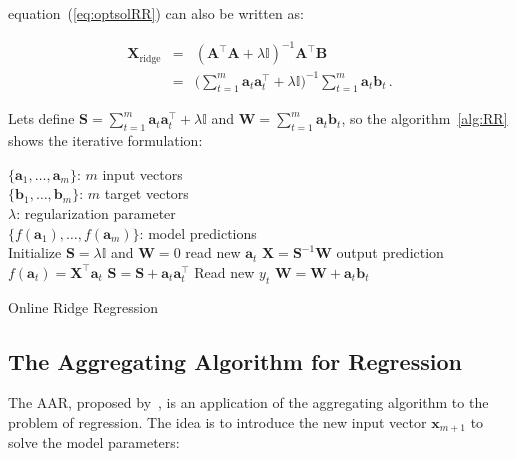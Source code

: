 \noindent equation~(\ref{eq:optsolRR}) can also be written as:

\begin{eqnarray*}
\label{eq:RReapand}
\mathbf{\mathbf{X}}_{\text{ridge}}&=&(\mathbf{A}^\top \mathbf{A}+ \lambda
\mathbb{I})^{-1}\mathbf{A}^\top \mathbf{B} \\
&=& \displaystyle \big (\sum_{t=1}^m
\mathbf{a}_t \mathbf{a}_t  ^\top + \lambda \mathbb{I}\big )^{-1}
\sum_{t=1}^m \mathbf{a}_t \mathbf{b}_t \, .
\end{eqnarray*}

Lets define $\displaystyle\mathbf{S}= \sum_{t=1}^m \mathbf{a}_t
\mathbf{a}_t  ^\top + \lambda \mathbb{I} $ and $\mathbf{W}=
\displaystyle\sum_{t=1}^m \mathbf{a}_t \mathbf{b}_t$, so the
algorithm~\ref{alg:RR} shows the iterative formulation:

\begin{algorithm}[H]
\begin{algorithmic}[1]
\REQUIRE $\,$ \\
$\{\mathbf{a}_1,\dots,\mathbf{a}_{m} \}$: $m$ input vectors \\
$\{\mathbf{b}_1,\dots,\mathbf{b}_{m} \}$: $m$ target vectors \\
$\lambda$: regularization parameter \\
\ENSURE  $\,$ \\
$\{f(\mathbf{a}_1),\dots,f(\mathbf{a}_{m}) \}$: model predictions \\
\STATE Initialize $\mathbf{S}=\lambda \mathbb{I}$
and $\mathbf{W}=0$
	\STATE read new $\mathbf{a}_t$
	\STATE $\mathbf{X}=\mathbf{S}^{-1}\mathbf{W}$
	\STATE output prediction $f(\mathbf{a}_t) = \mathbf{X}^\top \mathbf{a}_t$
   	\STATE $\mathbf{S} = \mathbf{S} + \mathbf{a}_t \mathbf{a}_t^\top$
   	\STATE Read new $y_t$
    	\STATE $\mathbf{W} = \mathbf{W} + \mathbf{a}_t \mathbf{b}_t$
\ENDFOR
\end{algorithmic}
\caption{Online Ridge Regression}
\label{alg:RR}
\end{algorithm}



\subsection{The Aggregating Algorithm for Regression}

The AAR, proposed by~\cite{vovk2001}, is an application of the aggregating
algorithm to the problem of regression. The idea is to introduce the new input
vector $\mathbf{x}_{m+1}$ to solve the model parameters: 

